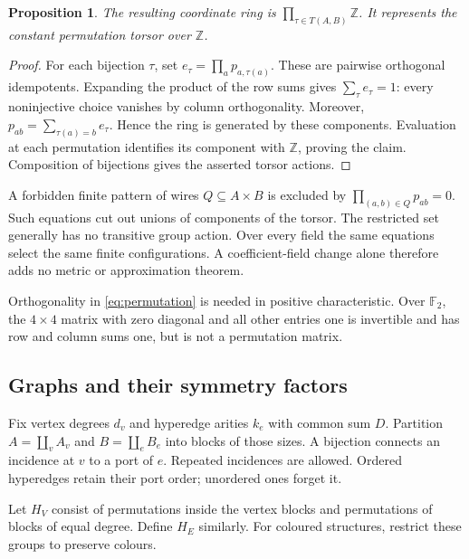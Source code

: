 \documentclass[11pt]{article}
\newtheorem{proposition}[theorem]{Proposition}
\theoremstyle{definition}
\newcommand{\Z}{\mathbb Z}
\numberwithin{equation}{section}
\begin{document}
\begin{proposition}\label{prop:ring}
The resulting coordinate ring is $\prod_{\tau\in T(A,B)}\Z$.
It represents the constant permutation torsor over $\Z$.
\end{proposition}
\begin{proof}
For each bijection $\tau$, set $e_\tau=\prod_a p_{a,\tau(a)}$.
These are pairwise orthogonal idempotents. Expanding the product of
the row sums gives $\sum_\tau e_\tau=1$: every noninjective choice
vanishes by column orthogonality. Moreover,
$p_{ab}=\sum_{\tau(a)=b}e_\tau$.
Hence the ring is generated by these components. Evaluation at each
permutation identifies its component with $\Z$, proving the claim.
Composition of bijections gives the asserted torsor actions.
\end{proof}

A forbidden finite pattern of wires $Q\subseteq A\times B$ is
excluded by $\prod_{(a,b)\in Q}p_{ab}=0$.
Such equations cut out unions of components of the torsor.
The restricted set generally has no transitive group action.
Over every field the same equations select the same finite
configurations. A coefficient-field change alone therefore adds
no metric or approximation theorem.

Orthogonality in \eqref{eq:permutation} is needed in positive
characteristic. Over $\mathbb F_2$, the $4\times4$ matrix with
zero diagonal and all other entries one is invertible and has
row and column sums one, but is not a permutation matrix.

\subsection{Graphs and their symmetry factors}
Fix vertex degrees $d_v$ and hyperedge arities $k_e$ with common sum
$D$. Partition $A=\coprod_vA_v$ and $B=\coprod_eB_e$ into blocks
of those sizes. A bijection connects an incidence at $v$ to a port
of $e$. Repeated incidences are allowed. Ordered hyperedges retain
their port order; unordered ones forget it.

Let $H_V$ consist of permutations inside the vertex blocks and
permutations of blocks of equal degree. Define $H_E$ similarly.
For coloured structures, restrict these groups to preserve colours.
\end{document}

